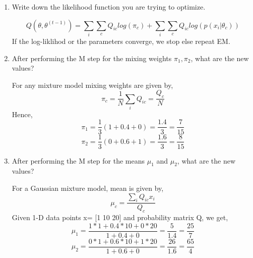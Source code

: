 \documentclass{article}
\begin{document}
\begin{enumerate}[label=(\alph*)]
\item Write down the likelihood function you are trying to optimize.
\begin{mdframed}[backgroundcolor=lightgray]
\begin{equation}
Q(\theta, \theta^{(t-1)}) = \sum_{i}{\sum_{c}{Q_{ic}log(\pi_{c})}}  + \sum_{i}{\sum_{c}{Q_{ic}log(p(x_i|\theta_c))}} 
\end{equation}
If the log-liklihod or the parameters converge, we stop else repeat EM.
\end{mdframed}

\item After performing the M step for the mixing weights $\pi_1, \pi_2$, what are the new values?
\begin{mdframed}[backgroundcolor=lightgray]
For any mixture model mixing weights are given by,
\begin{equation}
\pi_c = \frac{1}{N}\sum_i{Q_{ic}} = \frac{Q_c}{N}
\end{equation}
Hence,
\begin{equation}
\pi_1 = \frac{1}{3}(1+0.4+0) = \frac{1.4}{3} = \frac{7}{15} 
\end{equation}
\begin{equation}
\pi_2 = \frac{1}{3}(0+0.6+1) = \frac{1.6}{3} = \frac{8}{15} 
\end{equation}
\end{mdframed}
\item After performing the M step for the means $\mu_1$ and $\mu_2$, what are the new values?
\begin{mdframed}[backgroundcolor=lightgray]
For a Gaussian mixture model, mean is given by,
\begin{equation}
\mu_c = \frac{\sum_i{Q_{ic}x_i}}{Q_c}
\end{equation}
Given 1-D data points x= [1  10  20] and probability matrix Q, we get,
\begin{equation}
\mu_1 = \frac{1*1 + 0.4*10 + 0*20}{1 + 0.4 + 0} = \frac{5}{1.4} = \frac{25}{7}
\end{equation}
\begin{equation}
\mu_2 = \frac{0*1 + 0.6*10 + 1*20}{1 + 0.6 + 0} = \frac{26}{1.6} = \frac{65}{4}
\end{equation}
\end{mdframed}


\end{enumerate}
\end{document}
